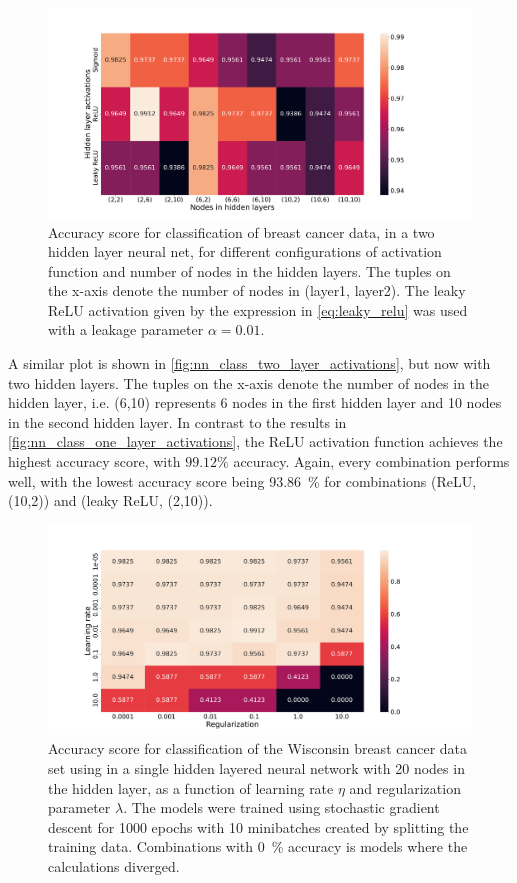 \documentclass[12pt]{article}
\begin{document}
\begin{figure}
    \centering
    \includegraphics[width=0.91\linewidth]{images/accuracy_activations_and_two_layers_fixed_eta.pdf}
    \caption{Accuracy score for classification of breast cancer data, in a two hidden layer neural net, for different configurations of activation function and number of nodes in the hidden layers. The tuples on the x-axis denote the number of nodes in (layer1, layer2). The leaky ReLU activation given by the expression in \autoref{eq:leaky_relu} was used with a leakage parameter $\alpha=0.01$.}
    \label{fig:nn_class_two_layer_activations}
\end{figure}

A similar plot is shown in \autoref{fig:nn_class_two_layer_activations}, but now with two hidden layers. The tuples on the x-axis denote the number of nodes in the hidden layer, i.e. (6,10) represents 6 nodes in the first hidden layer and 10 nodes in the second hidden layer. In contrast to the results in \autoref{fig:nn_class_one_layer_activations}, the ReLU activation function achieves the highest accuracy score, with $99.12\%$ accuracy. Again, every combination performs well, with the lowest accuracy score being \SI{93.86}{\%} for combinations (ReLU, (10,2)) and (leaky ReLU, (2,10)). 

\begin{figure}
    \centering
    \includegraphics[width=0.91\linewidth]{images/regularization_vs_learning_rate_20_nodes_fixed_learning_1000_epochs.pdf}
    \caption{Accuracy score for classification of the Wisconsin breast cancer data set using in a single hidden layered neural network with 20 nodes in the hidden layer, as a function of learning rate $\eta$ and regularization parameter $\lambda$. The models were trained using stochastic gradient descent for 1000 epochs with 10 minibatches created by splitting the training data. Combinations with \SI{0}{\%} accuracy is models where the calculations diverged.}
    \label{fig:nn_class_lambda_vs_eta}
\end{figure}
\end{document}
